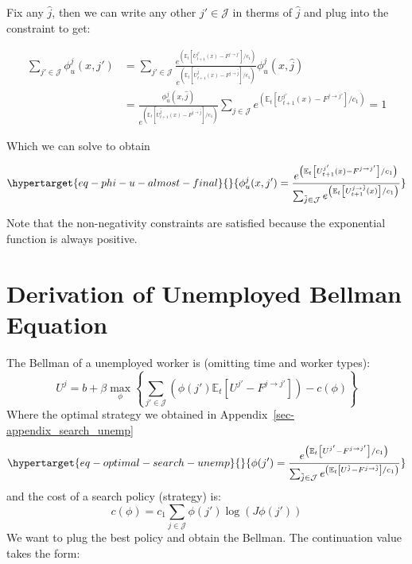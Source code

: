 \documentclass[
  letterpaper,
  DIV=11,
  numbers=noendperiod]{scrreprt}
\begin{document}
Fix any \(\hat{j}\), then we can write any other \(j'\in\mathcal{J}\) in
therms of \(\hat{j}\) and plug into the constraint to get:

\begin{align*}
  \sum_{j'\in \mathcal{J}}\phi^j_u(x, j') &= \sum_{j'\in \mathcal{J}}\frac{e^{\left(\mathbb{E}_t\left[U^{j'}_{t+1}(x) - F^{j \to j'}\right] /c_1\right)}}{e^{\left(\mathbb{E}_t\left[U^{ \hat{j}}_{t+1}(x) - F^{j \to \hat{j}}\right] /c_1\right)}} \phi^j_u(x, \hat{j})\\  &= \frac{\phi^j_u(x, \hat{j})}{e^{\left(\mathbb{E}_t\left[U^{ \hat{j}}_{t+1}(x) - F^{j \to \hat{j}}\right] /c_1\right)}} \sum_{j\in \mathcal{J}}e^{\left(\mathbb{E}_t\left[U^{j'}_{t+1}(x) - F^{j \to j'}\right] /c_1\right)} = 1
\end{align*}

Which we can solve to obtain

\begin{equation}\protect\hypertarget{eq-phi-u-almost-final}{}{
  \phi^j_u(x,j') = \frac{e^{\left(\mathbb{E}_t\left[U^{j'}_{t+1}(x) - F^{j \to j'}\right] /c_1\right)}}{\sum_{\tilde{j}\in \mathcal{J}}e^{\left(\mathbb{E}_t\left[U^{j \to \tilde{j}}_{t+1}(x)\right] /c_1\right)}}}\label{eq-phi-u-almost-final}\end{equation}

Note that the non-negativity constraints are satisfied because the
exponential function is always positive.

\hypertarget{sec-appendix_bellman_unemp}{%
\chapter{Derivation of Unemployed Bellman
Equation}\label{sec-appendix_bellman_unemp}}

The Bellman of a unemployed worker is (omitting time and worker types):
\[U^{j} = b + \beta\max_{\phi}\left\{\sum_{j'\in \mathcal{J}} \left(\phi(j')\mathbb{E}_t\left[U^{j'} - F^{j \to j'} \right]\right) -c(\phi) \right\}\]
Where the optimal strategy we obtained in
Appendix~\ref{sec-appendix_search_unemp}
\begin{equation}\protect\hypertarget{eq-optimal-search-unemp}{}{\phi(j') = \frac{e^{\left(\mathbb{E}_t\left[U^{j'} - F^{j \to j'}\right] /c_1\right)}}{\sum_{\tilde{j}\in \mathcal{J}}e^{\left(\mathbb{E}_t\left[U^{\tilde{j}} - F^{j \to \tilde{j}}\right] /c_1\right)}}}\label{eq-optimal-search-unemp}\end{equation}
and the cost of a search policy (strategy) is:
\[c(\phi) = c_{1} \sum_{j\in \mathcal{J}}\phi(j')\log(J \phi(j'))\] We
want to plug the best policy and obtain the Bellman. The continuation
value takes the form:
\end{document}
